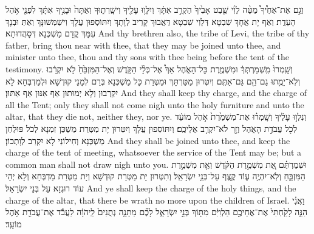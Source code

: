 {וְגַ֣ם אֶת־אַחֶ֩יךָ֩ מַטֵּ֨ה לֵוִ֜י שֵׁ֤בֶט אָבִ֙יךָ֙ הַקְרֵ֣ב אִתָּ֔ךְ וְיִלָּו֥וּ עָלֶ֖יךָ וִישָֽׁרְת֑וּךָ וְאַתָּה֙ וּבָנֶ֣יךָ אִתָּ֔ךְ לִפְנֵ֖י אֹ֥הֶל הָעֵדֻֽת׃
}
{וְאַף יָת אֲחָךְ שִׁבְטָא דְּלֵוִי שִׁבְטָא דַּאֲבוּךְ קָרֵיב לְוָתָךְ וְיִתּוֹסְפוּן עֲלָךְ וִישַׁמְּשׁוּנָּךְ וְאַתְּ וּבְנָךְ עִמָּךְ קֳדָם מַשְׁכְּנָא דְּסָהֲדוּתָא׃}
{And thy brethren also, the tribe of Levi, the tribe of thy father, bring thou near with thee, that they may be joined unto thee, and minister unto thee, thou and thy sons with thee being before the tent of the testimony.}{}
{וְשָֽׁמְרוּ֙ מִֽשְׁמַרְתְּךָ֔ וּמִשְׁמֶ֖רֶת כׇּל־הָאֹ֑הֶל אַךְ֩ אֶל־כְּלֵ֨י הַקֹּ֤דֶשׁ וְאֶל־הַמִּזְבֵּ֙חַ֙ לֹ֣א יִקְרָ֔בוּ וְלֹֽא־יָמֻ֥תוּ גַם־הֵ֖ם גַּם־אַתֶּֽם׃}
{וְיִטְּרוּן מַטַּרְתָּךְ וּמַטְּרַת כָּל מַשְׁכְּנָא בְּרַם לְמָנֵי קוּדְשָׁא וּלְמַדְבְּחָא לָא יִקְרְבוּן וְלָא יְמוּתוּן אַף אִנּוּן אַף אַתּוּן׃}
{And they shall keep thy charge, and the charge of all the Tent; only they shall not come nigh unto the holy furniture and unto the altar, that they die not, neither they, nor ye.}{}
{וְנִלְו֣וּ עָלֶ֔יךָ וְשָֽׁמְר֗וּ אֶת־מִשְׁמֶ֙רֶת֙ אֹ֣הֶל מוֹעֵ֔ד לְכֹ֖ל עֲבֹדַ֣ת הָאֹ֑הֶל וְזָ֖ר לֹא־יִקְרַ֥ב אֲלֵיכֶֽם׃
}
{וְיִתּוֹסְפוּן עֲלָךְ וְיִטְּרוּן יָת מַטְּרַת מַשְׁכַּן זִמְנָא לְכֹל פּוּלְחַן מַשְׁכְּנָא וְחִילוֹנַי לָא יִקְרַב לְוָתְכוֹן׃}
{And they shall be joined unto thee, and keep the charge of the tent of meeting, whatsoever the service of the Tent may be; but a common man shall not draw nigh unto you.}{}
{וּשְׁמַרְתֶּ֗ם אֵ֚ת מִשְׁמֶ֣רֶת הַקֹּ֔דֶשׁ וְאֵ֖ת מִשְׁמֶ֣רֶת הַמִּזְבֵּ֑חַ וְלֹֽא־יִהְיֶ֥ה ע֛וֹד קֶ֖צֶף עַל־בְּנֵ֥י יִשְׂרָאֵֽל׃
}
{וְתִטְּרוּן יָת מַטְּרַת קוּדְשָׁא וְיָת מַטְּרַת מַדְבְּחָא וְלָא יְהֵי עוֹד רוּגְזָא עַל בְּנֵי יִשְׂרָאֵל׃}
{And ye shall keep the charge of the holy things, and the charge of the altar, that there be wrath no more upon the children of Israel.}{}
{וַאֲנִ֗י הִנֵּ֤ה לָקַ֙חְתִּי֙ אֶת־אֲחֵיכֶ֣ם הַלְוִיִּ֔ם מִתּ֖וֹךְ בְּנֵ֣י יִשְׂרָאֵ֑ל לָכֶ֞ם מַתָּנָ֤ה נְתֻנִים֙ לַֽיהֹוָ֔ה לַעֲבֹ֕ד אֶת־עֲבֹדַ֖ת אֹ֥הֶל מוֹעֵֽד׃
}
